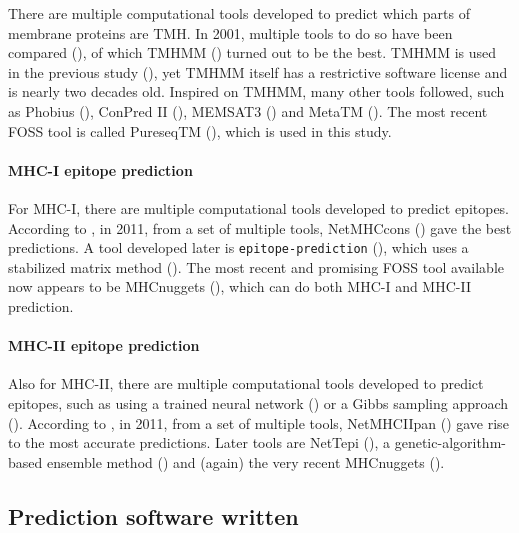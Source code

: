 There are multiple computational tools developed to predict which
parts of membrane proteins are TMH.
In 2001, multiple tools to do so have been compared (\cite{moller2001evaluation}),
of which TMHMM (\cite{krogh2001predicting}) turned out to be the best.
TMHMM is used in the previous study (\cite{bianchi2017}),
yet TMHMM itself has a restrictive software license and is nearly two
decades old. 
Inspired on TMHMM, many other tools followed, such as 
Phobius (\cite{kall2004combined}),
ConPred II (\cite{arai2004conpred}),
MEMSAT3 (\cite{jones2007improving})
and MetaTM (\cite{klammer2009metatm}).
The most recent FOSS tool is called PureseqTM (\cite{wang2019efficient}),
which is used in this study.

\paragraph{MHC-I epitope prediction}

For MHC-I, there are multiple computational tools developed 
to predict epitopes. 
According to \cite{lundegaard2011prediction}, in 2011,
from a set of multiple tools, 
NetMHCcons (\cite{karosiene2012netmhccons}) gave the best predictions.
A tool developed later is \verb;epitope-prediction; (\cite{bianchi2017}),
which uses a stabilized matrix method (\cite{kim2009derivation}).
The most recent and promising FOSS tool available now appears
to be MHCnuggets (\cite{shao2020high}), which can do both MHC-I 
and MHC-II prediction.

\paragraph{MHC-II epitope prediction}

Also for MHC-II, there are multiple computational tools developed 
to predict epitopes,
such as using a trained neural network (\cite{nielsen2003reliable})
or a Gibbs sampling approach (\cite{nielsen2004improved}).
According to \cite{lundegaard2011prediction}, in 2011,
from a set of multiple tools, 
NetMHCIIpan (\cite{nielsen2008quantitative,karosiene2013netmhciipan})
gave rise to the most accurate predictions.
Later tools are NetTepi (\cite{trolle2014nettepi}),
a genetic-algorithm-based ensemble method (\cite{zhang2015accurate})
and (again) the very recent MHCnuggets (\cite{shao2020high}).

\subsection{Prediction software written}

